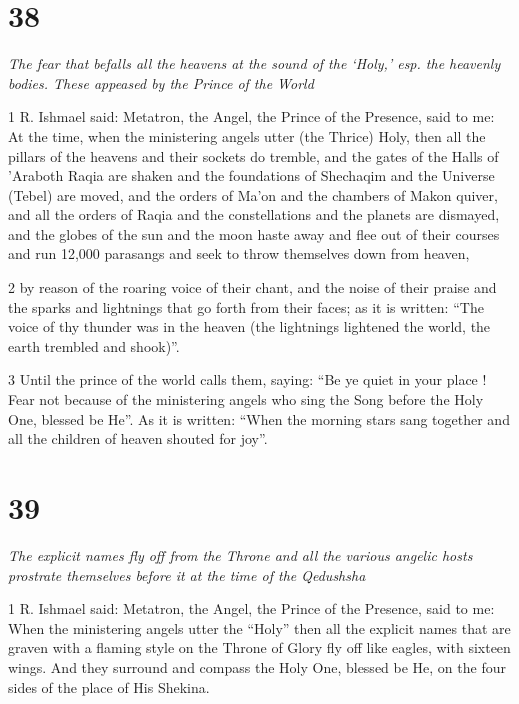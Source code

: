 \chapter{38}

\par \textit{The fear that befalls all the heavens at the sound of the ‘Holy,’ esp. the heavenly bodies. These appeased by the Prince of the World}

\par 1 R. Ishmael said: Metatron, the Angel, the Prince of the Presence, said to me: At the time, when the ministering angels utter (the Thrice) Holy, then all the pillars of the heavens and their sockets do tremble, and the gates of the Halls of 'Araboth Raqia are shaken and the foundations of Shechaqim and the Universe (Tebel) are moved, and the orders of Ma'on and the chambers of Makon quiver, and all the orders of Raqia and the constellations and the planets are dismayed, and the globes of the sun and the moon haste away and flee out of their courses and run 12,000 parasangs and seek to throw themselves down from heaven,

\par 2 by reason of the roaring voice of their chant, and the noise of their praise and the sparks and lightnings that go forth from their faces; as it is written: “The voice of thy thunder was in the heaven (the lightnings lightened the world, the earth trembled and shook)”. 

\par 3 Until the prince of the world calls them, saying: “Be ye quiet in your place ! Fear not because of the ministering angels who sing the Song before the Holy One, blessed be He”. As it is written: “When the morning stars sang together and all the children of heaven shouted for joy”. 



\chapter{39}

\par \textit{The explicit names fly off from the Throne and all the various angelic hosts prostrate themselves before it at the time of the Qedushsha}

\par 1 R. Ishmael said: Metatron, the Angel, the Prince of the Presence, said to me: When the ministering angels utter the “Holy” then all the explicit names that are graven with a flaming style on the Throne of Glory fly off like eagles, with sixteen wings. And they surround and compass the Holy One, blessed be He, on the four sides of the place of His Shekina. 

